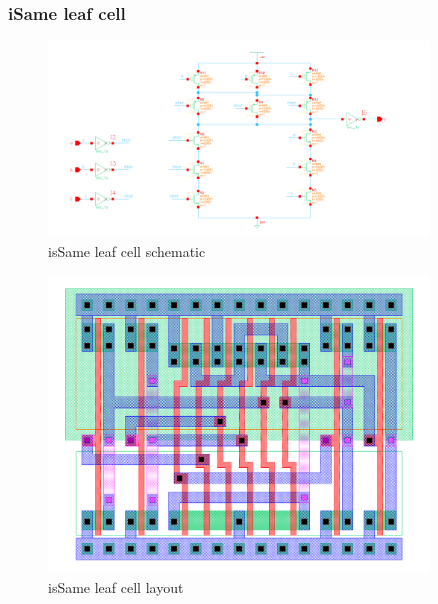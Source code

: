 \documentclass[]{article}
\begin{document}
\subsubsection{iSame leaf cell}
\begin{figure}[H]
\centering
\includegraphics[width=0.9\textwidth]{isSame-schematic}
\caption{isSame leaf cell schematic}
\label{fig:isSame-schematic}
\end{figure}

\begin{figure}[H]
\centering
\includegraphics[width=0.9\textwidth]{isSame-layout}
\caption{isSame leaf cell layout}
\label{fig:isSame-layout}
\end{figure}

\end{document}
